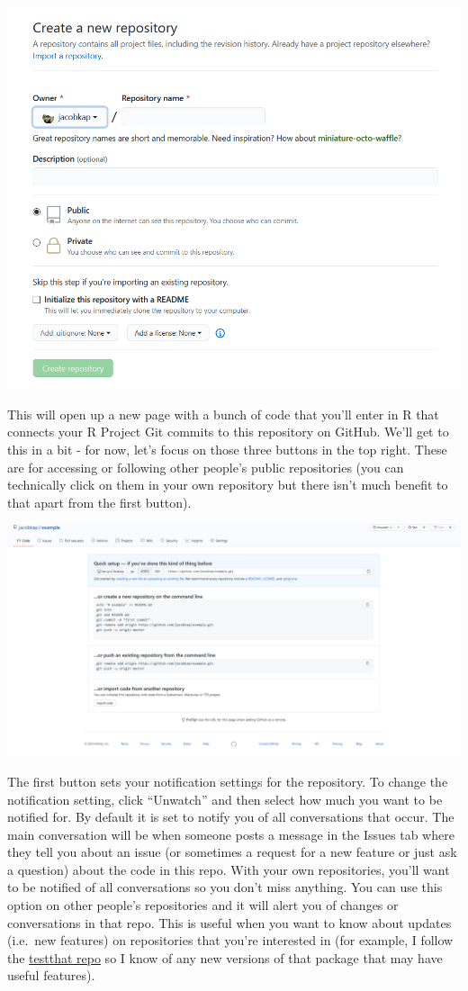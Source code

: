 \documentclass[
  12pt,
  openany]{book}
\begin{document}
\includegraphics{images/Github_new_repo2.PNG}

This will open up a new page with a bunch of code that you'll enter in R that connects your R Project Git commits to this repository on GitHub. We'll get to this in a bit - for now, let's focus on those three buttons in the top right. These are for accessing or following other people's public repositories (you can technically click on them in your own repository but there isn't much benefit to that apart from the first button).

\includegraphics{images/Github_new_repo3.PNG}

The first button sets your notification settings for the repository. To change the notification setting, click ``Unwatch'' and then select how much you want to be notified for. By default it is set to notify you of all conversations that occur. The main conversation will be when someone posts a message in the Issues tab where they tell you about an issue (or sometimes a request for a new feature or just ask a question) about the code in this repo. With your own repositories, you'll want to be notified of all conversations so you don't miss anything. You can use this option on other people's repositories and it will alert you of changes or conversations in that repo. This is useful when you want to know about updates (i.e.~new features) on repositories that you're interested in (for example, I follow the \href{https://Github.com/r-lib/testthat}{testthat repo} so I know of any new versions of that package that may have useful features).
\end{document}
